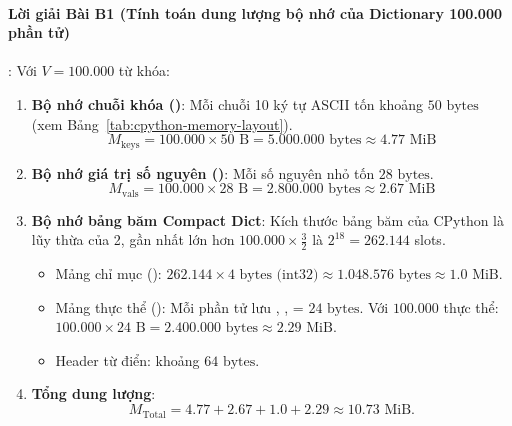 \paragraph{Lời giải Bài B1 (Tính toán dung lượng bộ nhớ của Dictionary 100.000 phần tử)}:
Với $V = 100.000$ từ khóa:
\begin{enumerate}
  \item \textbf{Bộ nhớ chuỗi khóa ()}: Mỗi chuỗi 10 ký tự ASCII tốn khoảng $50\text{ bytes}$ (xem Bảng~\ref{tab:cpython-memory-layout}). 
  \begin{equation*}
  M_{\text{keys}} = 100.000 \times 50\text{ B} = 5.000.000\text{ bytes} \approx 4.77\text{ MiB}
  \end{equation*}
  \item \textbf{Bộ nhớ giá trị số nguyên ()}: Mỗi số nguyên nhỏ tốn $28\text{ bytes}$.
  \begin{equation*}
  M_{\text{vals}} = 100.000 \times 28\text{ B} = 2.800.000\text{ bytes} \approx 2.67\text{ MiB}
  \end{equation*}
  \item \textbf{Bộ nhớ bảng băm Compact Dict}:
  Kích thước bảng băm của CPython là lũy thừa của 2, gần nhất lớn hơn $100.000 \times \frac{3}{2}$ là $2^{18} = 262.144$ slots.
  \begin{itemize}
    \item Mảng chỉ mục (): $262.144 \times 4\text{ bytes (int32)} \approx 1.048.576\text{ bytes} \approx 1.0\text{ MiB}$.
    \item Mảng thực thể (): Mỗi phần tử lưu , ,  = $24\text{ bytes}$. Với $100.000$ thực thể: $100.000 \times 24\text{ B} = 2.400.000\text{ bytes} \approx 2.29\text{ MiB}$.
    \item Header từ điển: khoảng $64\text{ bytes}$.
  \end{itemize}
  \item \textbf{Tổng dung lượng}:
  \begin{equation*}
  M_{\text{Total}} = 4.77 + 2.67 + 1.0 + 2.29 \approx 10.73\text{ MiB}.
  \end{equation*}
\end{enumerate}

